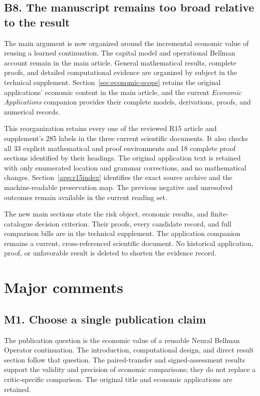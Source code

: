 \subsection*{B8. The manuscript remains too broad relative to the result}\label{resp:B8}
The main argument is now organized around the incremental economic value of reusing a learned continuation. The capital model and operational Bellman account remain in the main article. General mathematical results, complete proofs, and detailed computational evidence are organized by subject in the technical supplement. Section~\ref{sec:economic-scope} retains the original applications' economic content in the main article, and the current \emph{Economic Applications} companion provides their complete models, derivations, proofs, and numerical records.

This reorganization retains every one of the reviewed R15 article and supplement's 285 labels in the three current scientific documents. It also checks all 33 explicit mathematical and proof environments and 18 complete proof sections identified by their headings. The original application text is retained with only enumerated location and grammar corrections, and no mathematical changes. Section~\ref{app:r15index} identifies the exact source archive and the machine-readable preservation map. The previous negative and unresolved outcomes remain available in the current reading set.


The new main sections state the risk object, economic results, and finite-catalogue decision criterion. Their proofs, every candidate record, and full comparison bills are in the technical supplement. The application companion remains a current, cross-referenced scientific document. No historical application, proof, or unfavorable result is deleted to shorten the evidence record.

\section{Major comments}
\subsection*{M1. Choose a single publication claim}\label{resp:M1}
The publication question is the economic value of a reusable Neural Bellman Operator continuation. The introduction, computational design, and direct result section follow that question. The paired-transfer and signed-assessment results support the validity and precision of economic comparisons; they do not replace a critic-specific comparison. The original title and economic applications are retained.

